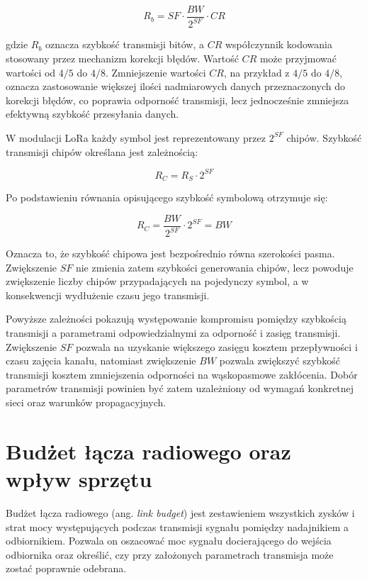 \documentclass[12pt,a4paper,twoside]{report}
\theoremstyle{definition} %
\begin{document}
	\begin{equation}\label{R_b}
        R_b = SF \cdot \frac{BW}{2^{SF}} \cdot CR
    \end{equation}

gdzie \(R_b\) oznacza szybkość transmisji bitów, a \(CR\) współczynnik kodowania stosowany przez mechanizm korekcji błędów. Wartość \(CR\) może przyjmować wartości od \(4/5\) do \(4/8\). Zmniejszenie wartości \(CR\), na przykład z \(4/5\) do \(4/8\), oznacza zastosowanie większej ilości nadmiarowych danych przeznaczonych do korekcji błędów, co poprawia odporność transmisji, lecz jednocześnie zmniejsza efektywną szybkość przesyłania danych.

W modulacji LoRa każdy symbol jest reprezentowany przez \(2^{SF}\) chipów. Szybkość transmisji chipów określana jest zależnością:

	\begin{equation}\label{R_C}
        R_C = R_S \cdot 2^{SF}
    \end{equation}

Po podstawieniu równania opisującego szybkość symbolową otrzymuje się:

	\begin{equation}\label{wzór}
        R_C = \frac{BW}{2^{SF}}\cdot 2^{SF}=BW
    \end{equation}

Oznacza to, że szybkość chipowa jest bezpośrednio równa szerokości pasma. Zwiększenie \(SF\) nie zmienia zatem szybkości generowania chipów, lecz powoduje zwiększenie liczby chipów przypadających na pojedynczy symbol, a w konsekwencji wydłużenie czasu jego transmisji.

Powyższe zależności pokazują występowanie kompromisu pomiędzy szybkością transmisji a parametrami odpowiedzialnymi za odporność i zasięg transmisji. Zwiększenie \(SF\) pozwala na uzyskanie większego zasięgu kosztem przepływności i czasu zajęcia kanału, natomiast zwiększenie \(BW\) pozwala zwiększyć szybkość transmisji kosztem zmniejszenia odporności na wąskopasmowe zakłócenia. Dobór parametrów transmisji powinien być zatem uzależniony od wymagań konkretnej sieci oraz warunków propagacyjnych.

\section{Budżet łącza radiowego oraz wpływ sprzętu}

Budżet łącza radiowego (ang. \textit{link budget}) jest zestawieniem wszystkich zysków i strat mocy występujących podczas transmisji sygnału pomiędzy nadajnikiem a odbiornikiem. Pozwala on oszacować moc sygnału docierającego do wejścia odbiornika oraz określić, czy przy założonych parametrach transmisja może zostać poprawnie odebrana.
\end{document}

